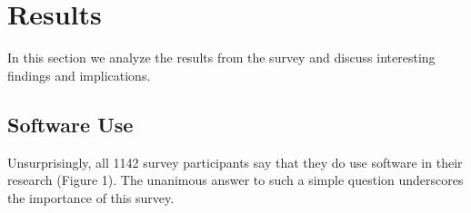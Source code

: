 \section{Results}

In this section we analyze the results from the survey and discuss interesting findings and implications.

\subsection{Software Use}
Unsurprisingly, all 1142 survey participants say that they do use software in their research (Figure 1). The unanimous answer to such a simple question underscores the importance of this survey.